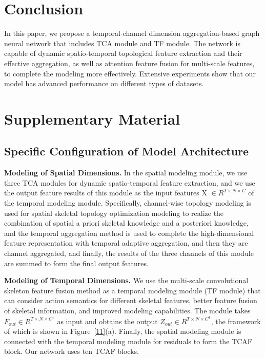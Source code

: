 \documentclass[letterpaper]{article} \usepackage[submission]{aaai23}  \usepackage{times}  \usepackage{helvet}  \usepackage{courier}  \usepackage[hyphens]{url}  \usepackage{graphicx} \urlstyle{rm} \def\UrlFont{\rm}  \usepackage{natbib}  \usepackage{caption} \frenchspacing  \setlength{\pdfpagewidth}{8.5in} \setlength{\pdfpageheight}{11in} \usepackage{algorithm}
\begin{document}
\section{Conclusion}
In this paper, we propose a temporal-channel dimension aggregation-based graph neural network that includes TCA module and TF module. The network is capable of dynamic spatio-temporal topological feature extraction and their effective aggregation, as well as attention feature fusion for multi-scale features, to complete the modeling more effectively. Extensive experiments show that our model has advanced performance on different types of datasets.


\clearpage
\appendix 
\section{Supplementary Material}
\subsection{Specific Configuration of Model Architecture}
{\bf Modeling of Spatial Dimensions.} In the spatial modeling module, we use three TCA modules for dynamic spatio-temporal feature extraction, and we use the output feature results of this module as the input features  X $\in R^{T \times N\times C}$ of the temporal modeling module. Specifically, channel-wise topology modeling is used for spatial skeletal topology optimization modeling to realize the combination of spatial a priori skeletal knowledge and a posteriori knowledge, and the temporal aggregation method is used to complete the high-dimensional feature representation with temporal adaptive aggregation, and then they are channel aggregated, and finally, the results of the three channels of this module are summed to form the final output features. 


\noindent
{\bf Modeling of Temporal Dimensions.} We use the multi-scale convolutional skeleton feature fusion method as a temporal modeling module (TF module) that can consider action semantics for different skeletal features, better feature fusion of skeletal information, and improved modeling capabilities. The module takes $F_{out} \in R^{T \times N\times C^{1}}$ as input and obtains the output $Z_{out} \in R^{T \times N\times C^{1}}$, the framework of which is shown in Figure~\ref{11}(a). Finally, the spatial modeling module is connected with the temporal modeling module for residuals to form the TCAF block. Our network uses ten TCAF blocks.
\end{document}
